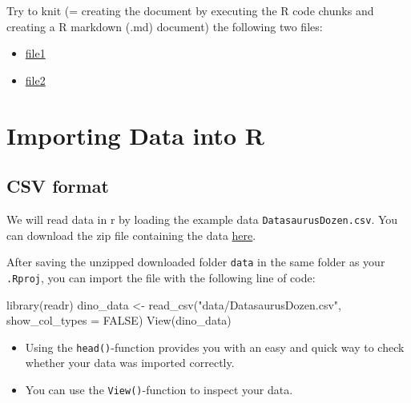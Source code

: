 \documentclass[
  letterpaper,
  DIV=11,
  numbers=noendperiod,
  oneside]{scrreprt}
\newenvironment{Shaded}{\begin{snugshade}}{\end{snugshade}}
\newcommand{\AttributeTok}[1]{\textcolor[rgb]{0.40,0.45,0.13}{#1}}
\newcommand{\ConstantTok}[1]{\textcolor[rgb]{0.56,0.35,0.01}{#1}}
\newcommand{\FunctionTok}[1]{\textcolor[rgb]{0.28,0.35,0.67}{#1}}
\newcommand{\NormalTok}[1]{\textcolor[rgb]{0.00,0.23,0.31}{#1}}
\newcommand{\OtherTok}[1]{\textcolor[rgb]{0.00,0.23,0.31}{#1}}
\newcommand{\StringTok}[1]{\textcolor[rgb]{0.13,0.47,0.30}{#1}}
\providecommand{\tightlist}{%
  \setlength{\itemsep}{0pt}\setlength{\parskip}{0pt}}\usepackage{longtable,booktabs,array}
\begin{document}
Try to knit (= creating the document by executing the R code chunks and
creating a R markdown (.md) document) the following two files:

\begin{itemize}
\item
  \href{./downloadable_files/faux-stub.Rmd}{file1}
\item
  \href{./downloadable_files/mixed-stub.Rmd}{file2}
\end{itemize}


\hypertarget{importing-data-into-r}{%
\chapter{Importing Data into R}\label{importing-data-into-r}}

\hfill\break

\hypertarget{csv-format}{%
\section{CSV format}\label{csv-format}}

We will read data in r by loading the example data
\texttt{DatasaurusDozen.csv}. You can download the zip file containing
the data \href{./downloadable_files/data.zip}{here}.

After saving the unzipped downloaded folder \texttt{data} in the same
folder as your \texttt{.Rproj}, you can import the file with the
following line of code:

\begin{Shaded}
\begin{Highlighting}[]
\FunctionTok{library}\NormalTok{(readr)}
\NormalTok{dino\_data }\OtherTok{\textless{}{-}} \FunctionTok{read\_csv}\NormalTok{(}\StringTok{"data/DatasaurusDozen.csv"}\NormalTok{, }\AttributeTok{show\_col\_types =} \ConstantTok{FALSE}\NormalTok{)}
\FunctionTok{View}\NormalTok{(dino\_data)}
\end{Highlighting}
\end{Shaded}

\begin{tcolorbox}[enhanced jigsaw, colframe=quarto-callout-tip-color-frame, bottomrule=.15mm, left=2mm, arc=.35mm, toprule=.15mm, opacityback=0, colback=white, rightrule=.15mm, breakable, leftrule=.75mm]
\begin{minipage}[t]{5.5mm}
\textcolor{quarto-callout-tip-color}{\faLightbulb}
\end{minipage}%
\begin{minipage}[t]{\textwidth - 5.5mm}

\begin{itemize}
\tightlist
\item
  Using the \texttt{head()}-function provides you with an easy and quick
  way to check whether your data was imported correctly.
\item
  You can use the \texttt{View()}-function to inspect your data.
\end{itemize}

\end{minipage}%
\end{tcolorbox}
\end{document}
